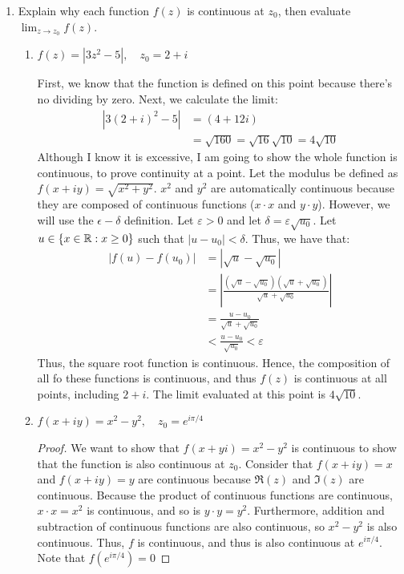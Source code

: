 \begin{enumerate}
\item Explain why each function $f(z)$ is continuous at $z_0$, then evaluate $\lim_{z \to z_0} f(z)$.
\begin{enumerate}
	\item $f(z) = |3z^2-5|, \quad z_0 = 2+i$
	\begin{problem}
		First, we know that the function is defined on this point because there's no dividing by zero. Next, we calculate the limit:
		\begin{align*}
			|3(2+i)^2 - 5| &= (4+12i)\\
			&= \sqrt{160} = \sqrt{16}\sqrt{10}=4\sqrt{10}
		\end{align*}
		Although I know it is excessive, I am going to show the whole function is continuous, to prove continuity at a point. \gline{}
		Let the modulus be defined as $f(x+iy) = \sqrt{x^2 + y^2}$. $x^2$ and $y^2$ are automatically continuous because they are composed of continuous functions ($x\cdot x$ and $y\cdot y$). However, we will use the $\epsilon{-}\delta$ definition. \gline{}
		Let $\varepsilon> 0$ and let $\delta  = \varepsilon\sqrt{u_0}$. Let $u\in\{x\in\mathbb{R} : x\ge 0\}$ such that $|u - u_0|<\delta$. Thus, we have that:
		\begin{align*}
			|f(u) - f(u_0)| &= |\sqrt{u}-\sqrt{u_0}|\\
			&= \left|\frac{(\sqrt{u}-\sqrt{u_0})(\sqrt{u}+\sqrt{u_0})}{\sqrt{u}+\sqrt{u_0}}\right|\\
			&= \frac{u - u_0}{\sqrt{u}+\sqrt{u_0}}\\
			&< \frac{u - u_0}{\sqrt{u_0}}< \varepsilon
		\end{align*}
		Thus, the square root function is continuous. \gline{}
		Hence, the composition of all fo these functions is continuous, and thus $f(z)$ is continuous at all points, including $2+i$. \gline{}
		The limit evaluated at this point is $4\sqrt{10}$.
	\end{problem}
	\item $f(x+iy) = x^2-y^2, \quad z_0 = e^{i\pi/4}$
	\begin{proof}
		We want to show that $f(x+yi) = x^2 - y^2$ is continuous to show that the function is also continuous at $z_0$.\gline{}
		Consider that $f(x+iy) = x$ and $f(x+iy) = y$ are continuous because $\Re(z)$ and $\Im(z)$ are continuous. Because the product of continuous functions are continuous, $x\cdot x = x^2$ is continuous, and so is $y \cdot y = y^2$. Furthermore, addition and subtraction of continuous functions are also continuous, so $x^2 - y^2$ is also continuous.\gline{}
		Thus, $f$ is continuous, and thus is also continuous at $e^{i\pi/4}$. Note that $f(e^{i\pi/4}) = 0$
	\end{proof}
	

\end{enumerate}
\end{enumerate}
